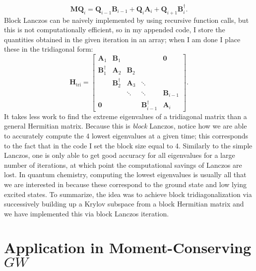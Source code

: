 \documentclass[12pt]{article} %
\begin{document}
\begin{equation}
 \mathbf{M Q}_i=\mathbf{Q}_{i-1} \mathbf{B}_{i-1}+\mathbf{Q}_i \mathbf{A}_i+\mathbf{Q}_{i+1} \mathbf{B}_i^{\dagger}.
\end{equation}
Block Lanczos can be naively implemented by using recursive function calls, but this is not computationally efficient, so in my appended code, I store the quantities obtained in the given iteration in an array; when I am done I place these in the tridiagonal form:
\begin{equation}
\mathbf{H}_{\text{tri}} = \left[\begin{array}{ccccc}
\mathbf{A}_1 & \mathbf{B}_1 & & & \mathbf{0} \\
\mathbf{B}_1^{\dagger} & \mathbf{A}_2 & \mathbf{B}_2 & & \\
& \mathbf{B}_2^{\dagger} & \mathbf{A}_3 & \ddots & \\
& & \ddots & \ddots & \mathbf{B}_{i-1} \\
\mathbf{0} & & & \mathbf{B}_{i-1}^{\dagger} & \mathbf{A}_i
\end{array}\right].
\end{equation}
It takes less work to find the extreme eigenvalues of a tridiagonal matrix than a general Hermitian matrix. Because this is \emph{block} Lanczos, notice how we are able to accurately compute the 4 lowest eigenvalues at a given time; this corresponds to the fact that in the code I set the block size equal to 4. Similarly to the simple Lanczos, one is only able to get good accuracy for all eigenvalues for a large number of iterations, at which point the computational savings of Lanczos are lost. In quantum chemistry, computing the lowest eigenvalues is usually all that we are interested in because these correspond to the ground state and low lying excited states. To summarize, the idea was to achieve block tridiagonalization via successively building up a Krylov subspace from a block Hermitian matrix and we have implemented this via block Lanczos iteration.
\section{Application in Moment-Conserving $GW$}
\end{document}
